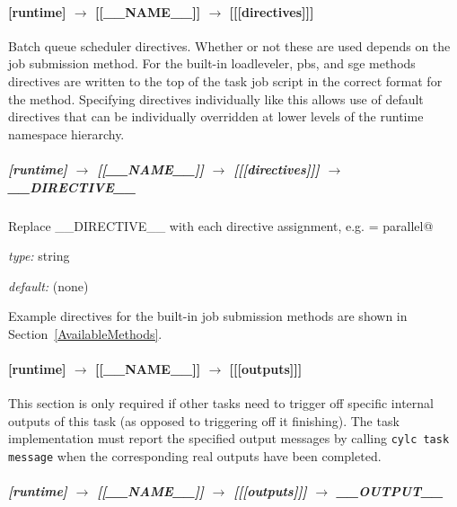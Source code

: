 \paragraph[{[[[}directives{]]]}]{[runtime] $\rightarrow$ [[\_\_NAME\_\_]] $\rightarrow$ [[[directives]]]}

Batch queue scheduler directives.  Whether or not these are used depends
on the job submission method. For the built-in loadleveler, pbs, and sge
methods directives are written to the top of the task job script in
the correct format for the method. Specifying directives individually
like this allows use of default directives that can be individually
overridden at lower levels of the runtime namespace hierarchy.

\subparagraph[\_\_DIRECTIVE\_\_ ]{[runtime] $\rightarrow$ [[\_\_NAME\_\_]] $\rightarrow$ [[[directives]]] $\rightarrow$ \_\_DIRECTIVE\_\_}

Replace \_\_DIRECTIVE\_\_ with each directive assignment, e.g.
\lstinline@class = parallel@

\begin{myitemize}
\item {\em type:} string
\item {\em default:} (none)
\end{myitemize}

Example directives for the built-in job submission methods are shown in
Section~\ref{AvailableMethods}.

\paragraph[{[[[}outputs{]]]}]{[runtime] $\rightarrow$ [[\_\_NAME\_\_]] $\rightarrow$ [[[outputs]]]}

This section is only required if other tasks need to trigger off specific
internal outputs of this task (as opposed to triggering off it finishing).
The task implementation must report the specified output messages
by calling \lstinline=cylc task message= when the
corresponding real outputs have been completed.

\subparagraph[\_\_OUTPUT\_\_ ]{[runtime] $\rightarrow$ [[\_\_NAME\_\_]] $\rightarrow$ [[[outputs]]] $\rightarrow$ \_\_OUTPUT\_\_}

